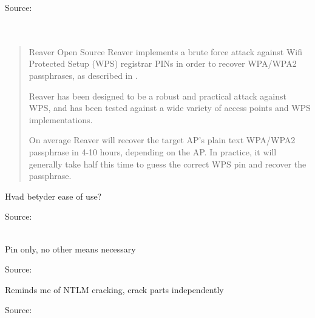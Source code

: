 \documentclass[20pt,landscape,a4paper,footrule]{foils}
\begin{document}
Source:\\
\\
\\




\begin{quote}
Reaver Open Source
Reaver implements a brute force attack against Wifi Protected Setup (WPS) registrar PINs in order to recover WPA/WPA2 passphrases, as described in .

Reaver has been designed to be a robust and practical attack against WPS, and has been tested against a wide variety of access points and WPS implementations.

On average Reaver will recover the target AP's plain text WPA/WPA2 passphrase in 4-10 hours, depending on the AP. In practice, it will generally take half this time to guess the correct WPS pin and recover the passphrase.
\end{quote}

\centerline{Hvad betyder ease of use?}

Source: \\
\\
{\footnotesize {}}



\centerline{Pin only, no other means necessary}

Source:\\





\centerline{Reminds me of NTLM cracking, crack parts independently}

Source:\\



\end{document}

